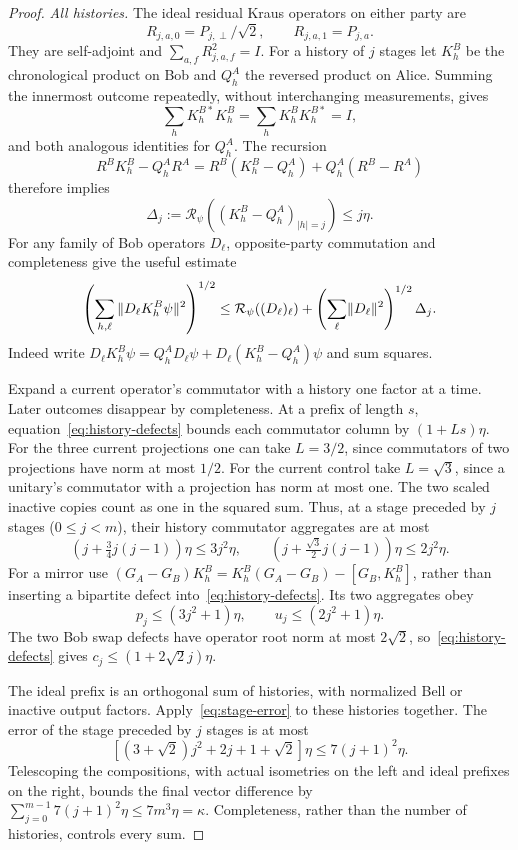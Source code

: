 \begin{proof}
\emph{All histories.} The ideal residual Kraus operators on either party are
\[
 R_{j,a,0}=P_{j,\perp}/\sqrt2,\qquad R_{j,a,1}=P_{j,a}.
\]
They are self-adjoint and $\sum_{a,f}R_{j,a,f}^2=I$. For a history of $j$ stages let $K_h^B$ be the chronological product on Bob and $Q_h^A$ the reversed product on Alice. Summing the innermost outcome repeatedly, without interchanging measurements, gives
\begin{equation}\label{eq:history-completeness}
 \sum_hK_h^{B*}K_h^B=\sum_hK_h^BK_h^{B*}=I,
\end{equation}
and both analogous identities for $Q_h^A$. The recursion
\[
 R^BK_h^B-Q_h^AR^A
 =R^B(K_h^B-Q_h^A)+Q_h^A(R^B-R^A)
\]
therefore implies
\[
 \Delta_j:=\mathcal R_\psi((K_h^B-Q_h^A)_{|h|=j})\le j\eta.
\]
For any family of Bob operators $D_\ell$, opposite-party commutation and completeness give the useful estimate
\begin{equation}\label{eq:history-defects}
 \left(\sum_{h,\ell}\|D_\ell K_h^B\psi\|^2\right)^{1/2}
 \le\mathcal R_\psi((D_\ell)_\ell)
 +\left(\sum_\ell\lVert D_\ell\rVert^2\right)^{1/2}\Delta_j.
\end{equation}
Indeed write $D_\ell K_h^B\psi=Q_h^AD_\ell\psi+D_\ell(K_h^B-Q_h^A)\psi$ and sum squares.

Expand a current operator's commutator with a history one factor at a time. Later outcomes disappear by completeness. At a prefix of length $s$, equation~\eqref{eq:history-defects} bounds each commutator column by $(1+Ls)\eta$. For the three current projections one can take $L=3/2$, since commutators of two projections have norm at most $1/2$. For the current control take $L=\sqrt3$, since a unitary's commutator with a projection has norm at most one. The two scaled inactive copies count as one in the squared sum. Thus, at a stage preceded by $j$ stages ($0\le j<m$), their history commutator aggregates are at most
\[
 (j+\tfrac34j(j-1))\eta\le3j^2\eta,\qquad
 (j+\tfrac{\sqrt3}2j(j-1))\eta\le2j^2\eta.
\]
For a mirror use $(G_A-G_B)K_h^B=K_h^B(G_A-G_B)-[G_B,K_h^B]$, rather than inserting a bipartite defect into~\eqref{eq:history-defects}. Its two aggregates obey
\[
 p_j\le(3j^2+1)\eta,\qquad u_j\le(2j^2+1)\eta.
\]
The two Bob swap defects have operator root norm at most $2\sqrt2$, so~\eqref{eq:history-defects} gives $c_j\le(1+2\sqrt2j)\eta$.

The ideal prefix is an orthogonal sum of histories, with normalized Bell or inactive output factors. Apply~\eqref{eq:stage-error} to these histories together. The error of the stage preceded by $j$ stages is at most
\[
 [(3+\sqrt2)j^2+2j+1+\sqrt2]\eta\le7(j+1)^2\eta.
\]
Telescoping the compositions, with actual isometries on the left and ideal prefixes on the right, bounds the final vector difference by $\sum_{j=0}^{m-1}7(j+1)^2\eta\le7m^3\eta=\kappa$. Completeness, rather than the number of histories, controls every sum.


\end{proof}
